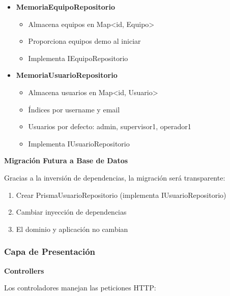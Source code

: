 \documentclass[12pt,a4paper]{article}
\begin{document}
\begin{itemize}
    \item \textbf{MemoriaEquipoRepositorio}
    \begin{itemize}
        \item Almacena equipos en Map<id, Equipo>
        \item Proporciona equipos demo al iniciar
        \item Implementa IEquipoRepositorio
    \end{itemize}

    \item \textbf{MemoriaUsuarioRepositorio}
    \begin{itemize}
        \item Almacena usuarios en Map<id, Usuario>
        \item Índices por username y email
        \item Usuarios por defecto: admin, supervisor1, operador1
        \item Implementa IUsuarioRepositorio
    \end{itemize}
\end{itemize}

\textbf{Migración Futura a Base de Datos}

Gracias a la inversión de dependencias, la migración será transparente:
\begin{enumerate}
    \item Crear PrismaUsuarioRepositorio (implementa IUsuarioRepositorio)
    \item Cambiar inyección de dependencias
    \item El dominio y aplicación no cambian
\end{enumerate}

\subsubsection{Capa de Presentación}

\textbf{Controllers}

Los controladores manejan las peticiones HTTP:
\end{document}
